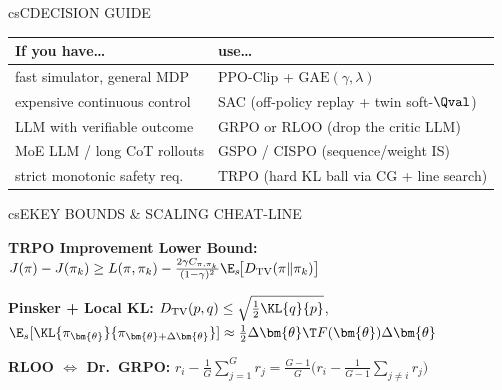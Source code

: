 \documentclass[../../../../master.tex]{subfiles}
\begin{document}
\begin{cscolumns}
\begin{cscard}{csC}{DECISION GUIDE}
  \renewcommand{\arraystretch}{1.22}\small
  \begin{tabular}{@{}>{\raggedright\arraybackslash}p{3.2cm}>{\raggedright\arraybackslash}p{4.6cm}@{}}
    \textbf{If you have\ldots} & \textbf{use\ldots}\\ \hline
    fast simulator, general MDP & PPO-Clip + $\mathrm{GAE}(\gamma,\lambda)$\\
    expensive continuous control & SAC (off-policy replay + twin soft-$\Qval$)\\
    LLM with verifiable outcome & GRPO or RLOO (drop the critic LLM)\\
    MoE LLM / long CoT rollouts & GSPO / CISPO (sequence/weight IS)\\
    strict monotonic safety req. & TRPO (hard KL ball via CG + line search)\\
  \end{tabular}
\end{cscard}

\begin{cscard}{csE}{KEY BOUNDS \& SCALING CHEAT-LINE}
  \begin{csbul}
    \item \textbf{TRPO Improvement Lower Bound:}
      $J(\pi)-J(\pi_k) \ge L(\pi,\pi_k) - \frac{2\gamma C_{\pi,\pi_k}}{(1-\gamma)^2}\E_{s}\!\big[D_{\mathrm{TV}}(\pi\|\pi_k)\big]$
    \item \textbf{Pinsker + Local KL:} $D_{\mathrm{TV}}(p,q)\le\sqrt{\frac{1}{2}\KL{q}{p}}$, $\E_s[\KL{\pi_{\bm{\theta}}}{\pi_{\bm{\theta}+\Delta\bm{\theta}}}]\approx\frac{1}{2}\Delta\bm{\theta}\T F(\bm{\theta})\Delta\bm{\theta}$
    \item \textbf{RLOO $\iff$ Dr.\ GRPO:} $r_i - \frac{1}{G}\sum_{j=1}^G r_j = \frac{G-1}{G}\big(r_i - \frac{1}{G-1}\sum_{j\ne i} r_j\big)$
  \end{csbul}
\end{cscard}


\end{cscolumns}
\end{document}
